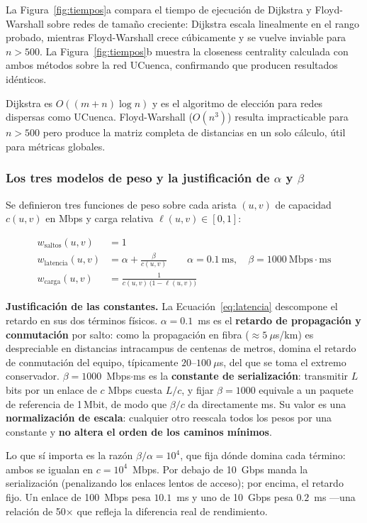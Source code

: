 \documentclass[11pt, a4paper]{article}
\begin{document}
La Figura~\ref{fig:tiempos}a compara el tiempo de ejecución de Dijkstra y
Floyd-Warshall sobre redes de tamaño creciente: Dijkstra escala linealmente
en el rango probado, mientras Floyd-Warshall crece cúbicamente y se vuelve
inviable para $n > 500$. La Figura~\ref{fig:tiempos}b muestra la closeness
centrality calculada con ambos métodos sobre la red UCuenca, confirmando
que producen resultados idénticos.

Dijkstra es $O((m + n)\log n)$ y es el algoritmo de elección para redes
dispersas como UCuenca. Floyd-Warshall ($O(n^3)$) resulta impracticable para
$n > 500$ pero produce la matriz completa de distancias en un solo cálculo,
útil para métricas globales.

\subsubsection*{Los tres modelos de peso y la justificación de $\alpha$ y $\beta$}

Se definieron tres funciones de peso sobre cada arista $(u,v)$ de capacidad
$c(u,v)$ en Mbps y carga relativa $\ell(u,v) \in [0,1]$:

\begin{align}
  w_{\text{saltos}}(u,v)   &= 1 \\
  w_{\text{latencia}}(u,v) &= \alpha + \frac{\beta}{c(u,v)}
     \qquad \alpha = 0.1\ \text{ms},\quad \beta = 1000\ \text{Mbps}\cdot\text{ms}
     \label{eq:latencia} \\
  w_{\text{carga}}(u,v)    &= \frac{1}{c(u,v)\,\bigl(1-\ell(u,v)\bigr)}
\end{align}

\textbf{Justificación de las constantes.} La Ecuación~\eqref{eq:latencia}
descompone el retardo en sus dos términos físicos.
$\alpha = 0.1$~ms es el \textbf{retardo de propagación y conmutación} por
salto: como la propagación en fibra ($\approx 5\ \mu$s/km) es despreciable
en distancias intracampus de centenas de metros, domina el retardo de
conmutación del equipo, típicamente $20$--$100\ \mu$s, del que se toma el
extremo conservador. $\beta = 1000$~Mbps$\cdot$ms es la \textbf{constante de
serialización}: transmitir $L$ bits por un enlace de $c$ Mbps cuesta $L/c$,
y fijar $\beta=1000$ equivale a un paquete de referencia de 1\,Mbit, de modo
que $\beta/c$ da directamente ms. Su valor es una \textbf{normalización de
escala}: cualquier otro reescala todos los pesos por una constante y
\textbf{no altera el orden de los caminos mínimos}.

Lo que sí importa es la razón $\beta/\alpha = 10^4$, que fija dónde domina
cada término: ambos se igualan en $c = 10^4$~Mbps. Por debajo de 10~Gbps
manda la serialización (penalizando los enlaces lentos de acceso); por
encima, el retardo fijo. Un enlace de 100~Mbps pesa $10.1$~ms y uno de
10~Gbps pesa $0.2$~ms —una relación de 50$\times$ que refleja la diferencia
real de rendimiento.
\end{document}
